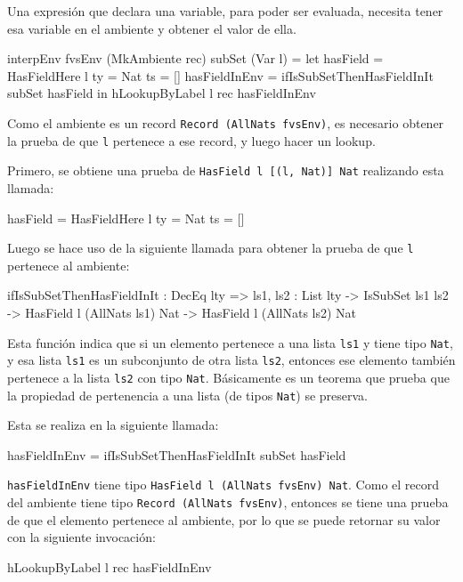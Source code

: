 Una expresión que declara una variable, para poder ser evaluada, necesita tener esa variable en el ambiente y obtener el valor de ella.

\begin{code}
interpEnv {fvsEnv} (MkAmbiente rec) subSet (Var l) = 
  let hasField = HasFieldHere {l} {ty = Nat} {ts = []}
      hasFieldInEnv = ifIsSubSetThenHasFieldInIt subSet hasField
  in hLookupByLabel l rec hasFieldInEnv
\end{code}

Como el ambiente es un record \texttt{Record (AllNats fvsEnv)}, es necesario obtener la prueba de que \texttt{l} pertenece a ese record, y luego hacer un lookup.

Primero, se obtiene una prueba de \texttt{HasField l [(l, Nat)] Nat} realizando esta llamada:

\begin{code}
hasField = HasFieldHere {l} {ty = Nat} {ts = []}
\end{code}      

Luego se hace uso de la siguiente llamada para obtener la prueba de que \texttt{l} pertenece al ambiente:

\begin{code}
ifIsSubSetThenHasFieldInIt : DecEq lty => {ls1, ls2 : List lty} -> 
  IsSubSet ls1 ls2 -> HasField l (AllNats ls1) Nat -> 
  HasField l (AllNats ls2) Nat
\end{code}

Esta función indica que si un elemento pertenece a una lista \texttt{ls1} y tiene tipo \texttt{Nat}, y esa lista \texttt{ls1} es un subconjunto de otra lista \texttt{ls2}, entonces ese elemento también pertenece a la lista \texttt{ls2} con tipo \texttt{Nat}. Básicamente es un teorema que prueba que la propiedad de pertenencia a una lista (de tipos \texttt{Nat}) se preserva.

Esta se realiza en la siguiente llamada:

\begin{code}
hasFieldInEnv = ifIsSubSetThenHasFieldInIt subSet hasField
\end{code}

\texttt{hasFieldInEnv} tiene tipo \texttt{HasField l (AllNats fvsEnv) Nat}. Como el record del ambiente tiene tipo \texttt{Record (AllNats fvsEnv)}, entonces se tiene una prueba de que el elemento pertenece al ambiente, por lo que se puede retornar su valor con la siguiente invocación:

\begin{code}
hLookupByLabel l rec hasFieldInEnv
\end{code}

